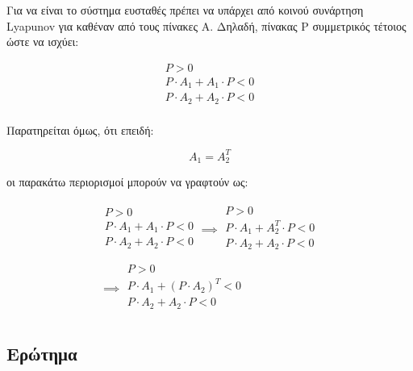 \documentclass{article}
\newcommand{\eng}[1]{\foreignlanguage{english}{#1}} %
\begin{document}
Για να είναι το σύστημα ευσταθές πρέπει να υπάρχει από κοινού συνάρτηση \eng{Lyapunov}
για καθέναν από τους πίνακες Α. Δηλαδή, πίνακας P συμμετρικός τέτοιος ώστε να ισχύει:

\begin{equation}
    \begin{aligned}
        P > 0 \\
        P \cdot A_1 + A_1 \cdot P < 0 \\
        P \cdot A_2 + A_2 \cdot P < 0 \\
    \end{aligned}
\end{equation}

Παρατηρείται όμως, ότι επειδή:

\begin{equation}
    A_1 = A_2^T
\end{equation}

οι παρακάτω περιορισμοί μπορούν να γραφτούν ως:

\begin{equation}
    \begin{gathered}
        \begin{aligned}
            P > 0 \\
            P \cdot A_1 + A_1 \cdot P < 0 \\
            P \cdot A_2 + A_2 \cdot P < 0 \\
        \end{aligned} \implies
        \begin{aligned}
            P > 0 \\
            P \cdot A_1 + A_2^T \cdot P < 0 \\
            P \cdot A_2 + A_2 \cdot P < 0 \\
        \end{aligned}  \\ \implies
        \begin{aligned}
            P > 0 \\
            P \cdot A_1 + \left(P \cdot A_2 \right)^T < 0 \\
            P \cdot A_2 + A_2 \cdot P < 0 \\
        \end{aligned}
    \end{gathered}
\end{equation}





\subsection{Ερώτημα}
\end{document}
